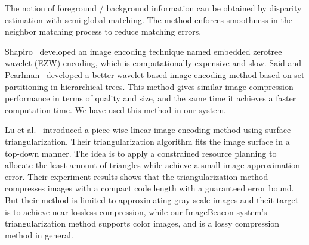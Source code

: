 The notion of foreground / background information can be obtained by disparity estimation with semi-global matching\cite{hirschmuller2005accurate}. The method enforces  smoothness in the neighbor matching process to reduce matching errors.


Shapiro~\cite{shapiro1993embedded} developed an image encoding technique named embedded zerotree wavelet (EZW) encoding, which is computationally expensive and slow. Said and Pearlman~\cite{said1996new} developed a better wavelet-based image encoding method based on set partitioning in hierarchical trees. This method gives similar image compression performance in terms of quality and size, and the same time it achieves a faster computation time. We have used this method in our system.

Lu et al.~\cite{lu2000piecewise} introduced a piece-wise linear image encoding method using surface triangularization. Their triangularization algorithm fits the image surface in a top-down manner. The idea is to apply a constrained resource planning to allocate the least amount of triangles while achieve a small image approximation error. Their experiment results shows that the triangularization method compresses images with a compact code length with a guaranteed error bound. But their method is limited to approximating gray-scale images and theit target is to achieve near lossless compression, while our ImageBeacon system's triangularization method supports color images, and is a lossy compression method in general.
